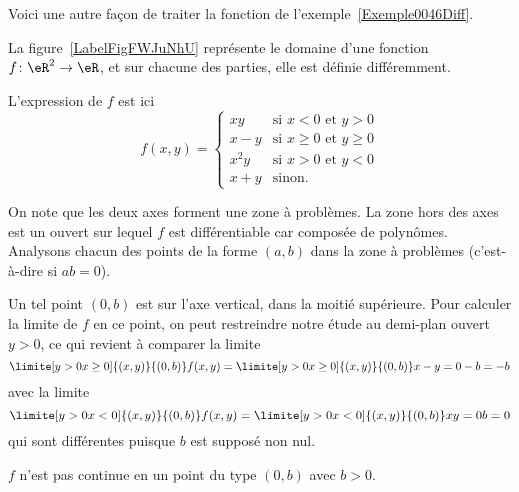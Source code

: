 Voici une autre façon de traiter la fonction de l'exemple~\ref{Exemple0046Diff}.

\begin{example} \label{ExeFHmCLII}
	La figure~\ref{LabelFigFWJuNhU} représente le domaine d'une fonction \( f\colon \eR^2\to \eR\), et sur chacune des parties, elle est définie différemment.
	\newcommand{\CaptionFigFWJuNhU}{La fonction de l'exemple~\ref{ExeFHmCLII}.}
	

	L'expression de \( f\) est ici
	\begin{equation}
		f(x,y) =
		\begin{cases}
			xy   & \text{si } x < 0 \text{ et } y > 0       \\
			x-y  & \text{si } x \geq 0 \text{ et } y \geq 0 \\
			x^2y & \text{si } x > 0 \text{ et } y < 0       \\
			x+y  & \text{sinon.}
		\end{cases}
	\end{equation}

	On note que les deux axes forment une zone à problèmes. La zone hors
	des axes est un ouvert sur lequel \( f\) est différentiable car composée
	de polynômes. Analysons chacun des points de la forme \( (a,b)\) dans la
	zone à problèmes (c'est-à-dire si \( ab = 0\)).
    \begin{subproof}

        \spitem[Si \( a = 0\) et \( b > 0\)]
    Un tel point \( (0,b)\) est sur
	l'axe vertical, dans la moitié supérieure. Pour calculer la limite de
	\( f\) en ce point, on peut restreindre notre étude au demi-plan ouvert
	\( y > 0\), ce qui revient à comparer la limite
	\begin{equation*}
		\limite[y>0\\x\geq 0] {(x,y)} {(0,b)} f(x,y) =   \limite[y>0\\x\geq
			0] {(x,y)} {(0,b)} x-y = 0 - b = -b
	\end{equation*}
	avec la limite
	\begin{equation*}
		\limite[y>0\\x<0] {(x,y)} {(0,b)} f(x,y) =   \limite[y>0\\x<0]
		{(x,y)} {(0,b)} xy = 0 b = 0
	\end{equation*}
	qui sont différentes puisque \( b\) est supposé non nul.

	\conclusion \( f\) n'est pas continue en un point du type \( (0,b)\) avec \( b
	> 0\).


\end{subproof}
\end{example}
